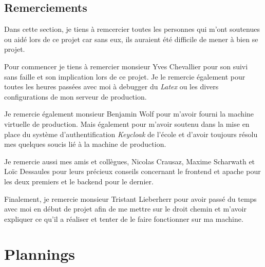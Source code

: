 \documentclass[
    iai, %
    il, %
]{heig-tb}
\begin{document}
\begin{enumerate}
\section{Remerciements}
Dans cette section, je tiens à remcercier toutes les personnes qui m'ont soutenues ou aidé lors de ce projet car sans eux, ils auraient été difficile de mener à bien se projet.

Pour commencer je tiens à remercier monsieur Yves Chevallier pour son suivi sans faille et son implication lors de ce projet. Je le remercie également pour toutes les heures passées avec moi à debugger du \emph{Latex} ou les divers configurations de mon serveur de production.

Je remercie également monsieur Benjamin Wolf pour m'avoir fourni la machine virtuelle de production. Mais également pour m'avoir soutenu dans la mise en place du système d'authentification \emph{Keycloak} de l'école et d'avoir toujours résolu mes quelques soucis lié à la machine de production.

Je remercie aussi mes amis et collègues, Nicolas Crausaz, Maxime Scharwath et Loïc Dessaules pour leurs précieux conseils concernant le \Gls{frontend} et \Gls{apache} pour les deux premiers et le \Gls{backend} pour le dernier.

Finalement, je remercie monsieur Tristant Lieberherr pour avoir passé du temps avec moi en début de projet afin de me mettre sur le droit chemin et m'avoir expliquer ce qu'il a réaliser et tenter de le faire fonctionner sur ma machine.

\vfil
\hspace{8cm}\makeatletter\@author\makeatother\par
\hspace{8cm}\begin{minipage}{5cm}
    \printsignature
\end{minipage}
\clearpage

\appendix
\appendixpage
\addappheadtotoc

\chapter{Plannings}

\begin{landscape}
    
\end{landscape}

\begin{landscape}
    
\end{landscape}


\end{enumerate}
\end{document}
